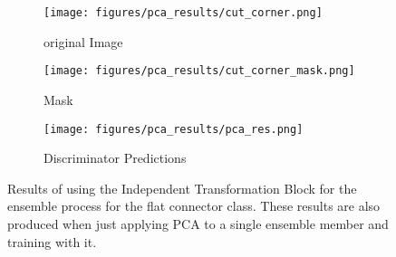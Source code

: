 \begin{figure}[htbp]
    \captionsetup[subfigure]{justification=centering}
    \centering
    \begin{subfigure}[b]{0.3\textwidth}
        \centering
        \texttt{[image: figures/pca\_results/cut\_corner.png]}
        \caption*{original Image}

    \end{subfigure}
    \begin{subfigure}[b]{0.3\textwidth}
        \centering
        \texttt{[image: figures/pca\_results/cut\_corner\_mask.png]}
        \caption*{Mask}

    \end{subfigure}
    \begin{subfigure}[b]{0.3\textwidth}
        \centering
        \texttt{[image: figures/pca\_results/pca\_res.png]}
        \caption*{Discriminator Predictions}

    \end{subfigure}
    \caption{Results of using the Independent Transformation Block \cite{EnsembleHeller2023} for the ensemble process for the flat connector class. 
             These results are also produced when just applying PCA to a single ensemble member and training with it.}
    \label{fig:pca_res}
\end{figure}
